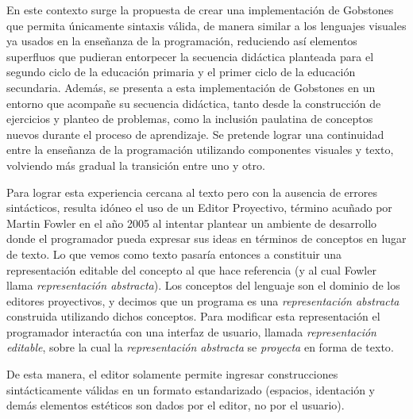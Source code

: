 En este contexto surge la propuesta de crear una implementación de Gobstones que permita únicamente sintaxis válida, de manera similar a los lenguajes visuales ya usados en la enseñanza de la programación, reduciendo así elementos superfluos que pudieran entorpecer la secuencia didáctica planteada para el segundo ciclo de la educación primaria y el primer ciclo de la educación secundaria.
Además, se presenta a esta implementación de Gobstones en un entorno que acompañe su secuencia didáctica, tanto desde la construcción de ejercicios y planteo de problemas, como la inclusión paulatina de conceptos nuevos durante el proceso de aprendizaje. Se pretende lograr una continuidad entre la enseñanza de la programación utilizando componentes visuales y texto, volviendo más gradual la transición entre uno y otro.


Para lograr esta experiencia cercana al texto pero con la ausencia de errores sintácticos, resulta idóneo el uso de un Editor Proyectivo, término acuñado por Martin Fowler en el año 2005\cite{Fowler} al intentar plantear un ambiente de desarrollo donde el programador pueda expresar sus ideas en términos de conceptos en lugar de texto. Lo que vemos como texto pasaría entonces a constituir una representación editable del concepto al que hace referencia (y al cual Fowler llama \textit{representación abstracta}). Los conceptos del lenguaje son el dominio de los editores proyectivos, y decimos que un programa es una \textit{representación abstracta} construida utilizando dichos conceptos. Para modificar esta representación el programador interactúa con una interfaz de usuario, llamada \textit{representación editable}, sobre la cual la \textit{representación abstracta} se \textit{proyecta} en forma de texto\cite{voelter2014projectional}. 

De esta manera, el editor solamente permite ingresar construcciones sintácticamente válidas en un formato estandarizado (espacios, identación y demás elementos estéticos son dados por el editor, no por el usuario).

